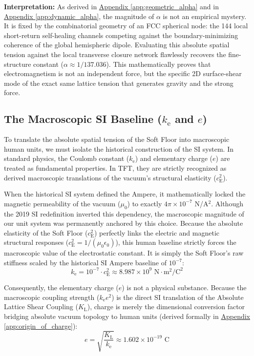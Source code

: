 \vspace{0.5em}
\noindent\textbf{Interpretation:} As derived in \hyperref[app:geometric_alpha]{Appendix \ref*{app:geometric_alpha}} and in \hyperref[app:dynamic_alpha]{Appendix \ref*{app:dynamic_alpha}}, the magnitude of $\alpha$ is not an empirical mystery. It is fixed by the combinatorial geometry of an FCC spherical node: the 144 local short-return self-healing channels competing against the boundary-minimizing coherence of the global hemispheric dipole. Evaluating this absolute spatial tension against the local transverse closure network flawlessly recovers the fine-structure constant ($\alpha \approx 1/137.036$). This mathematically proves that electromagnetism is not an independent force, but the specific 2D surface-shear mode of the exact same lattice tension that generates gravity and the strong force.

\subsection{The Macroscopic SI Baseline ($k_{\mathrm{e}}$ and $e$)}
To translate the absolute spatial tension of the Soft Floor into macroscopic human units, we must isolate the historical construction of the SI system. In standard physics, the Coulomb constant ($k_{\mathrm{e}}$) and elementary charge ($e$) are treated as fundamental properties. In TFT, they are strictly recognized as derived macroscopic translations of the vacuum's structural elasticity ($c_{\mathrm{E}}^2$).

When the historical SI system defined the Ampere, it mathematically locked the magnetic permeability of the vacuum ($\mu_0$) to exactly $4\pi \times 10^{-7}$ N/A$^2$. Although the 2019 SI redefinition inverted this dependency, the macroscopic magnitude of our unit system was permanently anchored by this choice. Because the absolute elasticity of the Soft Floor ($c_{\mathrm{E}}^2$) perfectly links the electric and magnetic structural responses ($c_{\mathrm{E}}^2 = 1/(\mu_0 \epsilon_0)$), this human baseline strictly forces the macroscopic value of the electrostatic constant. It is simply the Soft Floor's raw stiffness scaled by the historical SI Ampere baseline of $10^{-7}$:
\begin{equation}
    k_{\mathrm{e}} = 10^{-7} \cdot c_{\mathrm{E}}^2 \approx 8.987 \times 10^9 \text{ N}\cdot\text{m}^2/\text{C}^2
\end{equation}

Consequently, the elementary charge ($e$) is not a physical substance. Because the macroscopic coupling strength ($k_{\mathrm{e}} e^2$) is the direct SI translation of the Absolute Lattice Shear Coupling ($K_{\mathrm{L}}$), charge is merely the dimensional conversion factor bridging absolute vacuum topology to human units (derived formally in \hyperref[app:origin_of_charge]{Appendix \ref*{app:origin_of_charge}}):
\begin{equation}
    e = \sqrt{\frac{K_{\mathrm{L}}}{k_{\mathrm{e}}}} \approx 1.602 \times 10^{-19} \text{ C}
\end{equation}

